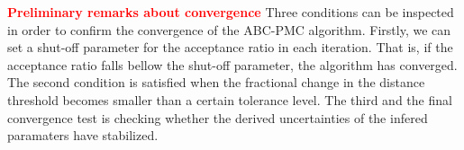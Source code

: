 \documentclass[12pt, preprint]{aastex}
\newcommand{\todo}[1]{{\bf \textcolor{red}{ #1}}}
\newcommand{\pars}{\vec{\theta}}
\begin{document}
\todo{Preliminary remarks about convergence}
Three conditions can be inspected in order to confirm the convergence of the ABC-PMC algorithm. Firstly, we can set a shut-off parameter for the acceptance ratio in each iteration. That is, if the acceptance ratio falls bellow the shut-off parameter, the algorithm has converged. The second condition is satisfied when the fractional change in the distance threshold becomes smaller than a certain tolerance level. The third and the final convergence test is checking whether the derived uncertainties of the infered paramaters have stabilized.



\end{document}
